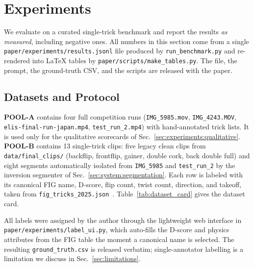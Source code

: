 \section{Experiments}
\label{sec:experiments}

We evaluate \sys{} on a curated single-trick benchmark and report the
results \emph{as measured}, including negative ones. All numbers in
this section come from a single \texttt{paper/experiments/results.jsonl}
file produced by \texttt{run\_benchmark.py} and re-rendered into LaTeX
tables by \texttt{paper/scripts/make\_tables.py}. The file, the
prompt, the ground-truth CSV, and the scripts are released with the
paper.

\subsection{Datasets and Protocol}
\label{sec:experiments:data}

\textbf{POOL-A} contains four full competition runs
(\texttt{IMG\_5985.mov}, \texttt{IMG\_4243.MOV},
\texttt{elis-final-run-japan.mp4}, \texttt{test\_run\_2.mp4}) with
hand-annotated trick lists. It is used only for the qualitative
scorecards of Sec.~\ref{sec:experiments:qualitative}.
\textbf{POOL-B} contains 13 single-trick clips: five legacy clean
clips from \texttt{data/final\_clips/} (backflip, frontflip, gainer,
double cork, back double full) and eight segments automatically
isolated from \texttt{IMG\_5985} and \texttt{test\_run\_2} by the
inversion segmenter of Sec.~\ref{sec:system:segmentation}. Each row
is labeled with its canonical FIG name, D-score, flip count, twist
count, direction, and takeoff, taken from
\texttt{fig\_tricks\_2025.json}~\cite{fig2025codepoints}.
Table~\ref{tab:dataset_card} gives the dataset card.

\begin{table}[t]
  \centering
  \small
  
  \caption{\textbf{Dataset card.} POOL-A is the end-to-end multi-trick
  set (not used for quantitative metrics in this paper); POOL-B is the
  per-trick benchmark that produces the numbers in
  Table~\ref{tab:main_results}.}
  \label{tab:dataset_card}
\end{table}

All labels were assigned by the author through the lightweight web
interface in \texttt{paper/experiments/label\_ui.py}, which auto-fills
the D-score and physics attributes from the FIG table the moment a
canonical name is selected. The resulting
\texttt{ground\_truth.csv} is released verbatim; single-annotator
labelling is a limitation we discuss in Sec.~\ref{sec:limitations}.

